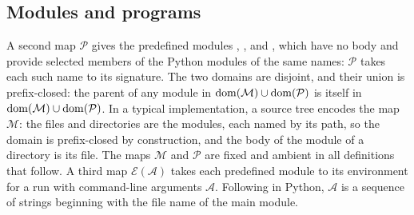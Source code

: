 \subsection{Modules and programs}
\label{sec:modules-programs}



A second map $\mathcal{P}$ gives the
predefined modules , ,  and , which have no body and provide selected members of the Python modules of the same names: $\mathcal{P}$ takes each such name to its
signature. The two domains are disjoint, and their union is
prefix-closed: the parent of any module in $\mathrm{dom}(\mathcal{M}) \cup \mathrm{dom}(\mathcal{P})$ is itself in
$\mathrm{dom}(\mathcal{M}) \cup \mathrm{dom}(\mathcal{P})$. In a typical implementation, a source tree
encodes the map $\mathcal{M}$: the  files and directories are the modules, each named by its path, so the
domain is prefix-closed by construction, and the body of the module of a directory is its
 file. The maps $\mathcal{M}$ and $\mathcal{P}$ are fixed and ambient in all
definitions that follow. A third map $\mathcal{E}(\mathcal{A})$ takes each predefined module to its environment for a run with command-line arguments $\mathcal{A}$. Following  in Python, $\mathcal{A}$ is a sequence of strings beginning with the file name of the main module.

